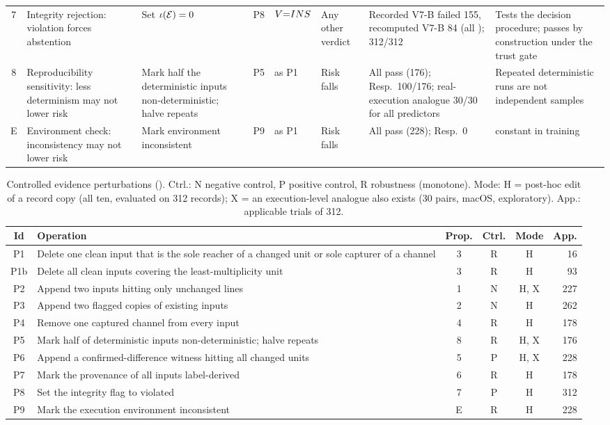 \begin{table}[!t]
\begin{tabular}{|c|L{2.35cm}|L{2.35cm}|c|L{2.1cm}|L{2.0cm}|L{3.3cm}|L{2.35cm}|}
7 & Integrity rejection: violation forces abstention & Set $\iota(\mathcal{E})=0$ & P8 & $V{=}INS{}$ & Any other verdict & Recorded V7-B failed 155, recomputed V7-B 84 (all \DIV{}); \sbg{} 312/312 & Tests the decision procedure; passes by construction under the trust gate \\
8 & Reproducibility sensitivity: less determinism may not lower risk & Mark half the deterministic inputs non-deterministic; halve repeats & P5 & as P1 & Risk falls & All pass (176); Resp.\ 100/176; real-execution analogue 30/30 for all predictors & Repeated deterministic runs are not independent samples \\
E & Environment check: inconsistency may not lower risk & Mark environment inconsistent & P9 & as P1 & Risk falls & All pass (228); Resp.\ 0 &  constant in training \\
\hline
\end{tabular}
\end{table}

\begin{table}[!t]
\caption{Controlled evidence perturbations (). Ctrl.: N negative control, P positive control, R robustness (monotone). Mode: H = post-hoc edit of a record copy (all ten, evaluated on 312 records); X = an execution-level analogue also exists (30 pairs, macOS, exploratory). App.: applicable trials of 312.}
\label{tab:perturb}
\centering
\scriptsize
\setlength{\tabcolsep}{2.4pt}
\begin{tabular}{|c|L{3.55cm}|c|c|c|r|}
\hline
Id & Operation & Prop. & Ctrl. & Mode & App. \\
\hline
P1 & Delete one clean input that is the sole reacher of a changed unit or sole capturer of a channel & 3 & R & H & 16 \\
P1b & Delete all clean inputs covering the least-multiplicity unit & 3 & R & H & 93 \\
P2 & Append two  inputs hitting only unchanged lines & 1 & N & H, X & 227 \\
P3 & Append two flagged copies of existing inputs & 2 & N & H & 262 \\
P4 & Remove one captured channel from every input & 4 & R & H & 178 \\
P5 & Mark half of deterministic  inputs non-deterministic; halve repeats & 8 & R & H, X & 176 \\
P6 & Append a confirmed-difference witness hitting all changed units & 5 & P & H, X & 228 \\
P7 & Mark the provenance of all inputs label-derived & 6 & R & H & 178 \\
P8 & Set the integrity flag to violated & 7 & P & H & 312 \\
P9 & Mark the execution environment inconsistent & E & R & H & 228 \\
\hline
\end{tabular}
\end{table}

